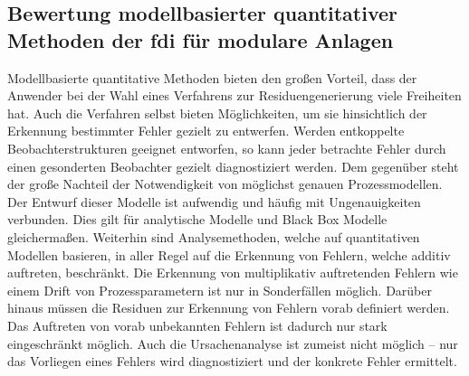 \subsection{Bewertung modellbasierter quantitativer Methoden der \ac{fdi} f\"ur modulare Anlagen}
Modellbasierte quantitative Methoden bieten den gro\ss{}en Vorteil, dass der Anwender bei der Wahl eines Verfahrens zur Residuengenerierung viele Freiheiten hat. Auch die Verfahren selbst bieten M\"oglichkeiten, um sie hinsichtlich der Erkennung bestimmter Fehler gezielt zu entwerfen. Werden entkoppelte Beobachterstrukturen geeignet entworfen, so kann jeder betrachte Fehler durch einen gesonderten Beobachter gezielt diagnostiziert werden. Dem gegen\"uber steht der gro\ss{}e Nachteil der Notwendigkeit von m\"oglichst genauen Prozessmodellen. Der Entwurf dieser Modelle ist aufwendig und h\"aufig mit Ungenauigkeiten verbunden. Dies gilt f\"ur analytische Modelle und Black Box Modelle gleicherma\ss{}en. Weiterhin sind Analysemethoden, welche auf quantitativen Modellen basieren, in aller Regel auf die Erkennung von Fehlern, welche additiv auftreten, beschr\"ankt. Die Erkennung von multiplikativ auftretenden Fehlern wie einem Drift von Prozessparametern ist nur in Sonderf\"allen m\"oglich. Dar\"uber hinaus m\"ussen die Residuen zur Erkennung von Fehlern vorab definiert werden. Das Auftreten von vorab  unbekannten Fehlern ist dadurch nur stark eingeschr\"ankt m\"oglich. Auch die Ursachenanalyse ist zumeist nicht m\"oglich -- nur das Vorliegen eines Fehlers wird diagnostiziert und der konkrete Fehler ermittelt.  {\cite[S. 17 f.]{Venkatasubramanian_2003}}

